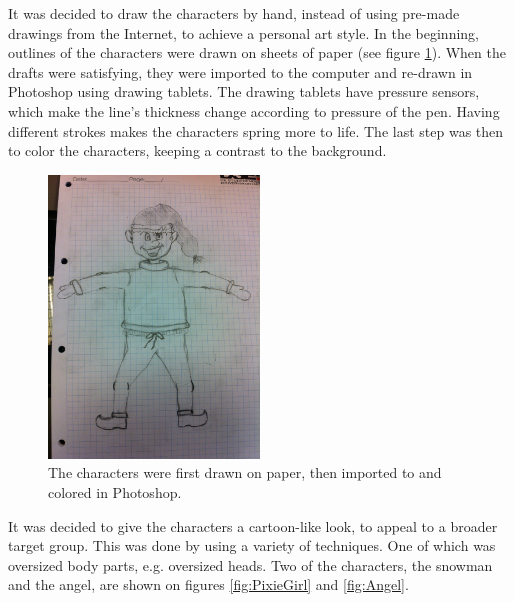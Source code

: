 It was decided to draw the characters by hand, instead of using pre-made drawings from the Internet, to achieve a personal art style. In the beginning, outlines of the characters were drawn on sheets of paper (see figure \ref{fig:boy_sketch}). When the drafts were satisfying, they were imported to the computer and re-drawn in Photoshop using drawing tablets. The drawing tablets have pressure sensors, which make the line's thickness change according to pressure of the pen. Having different strokes makes the characters spring more to life. The last step was then to color the characters, keeping a contrast to the background.

\begin{figure}[htbp]
\centering
\includegraphics[width=0.50\textwidth]{Pictures/Design/boy_sketch}
\caption{The characters were first drawn on paper, then imported to and colored in Photoshop.}
\label{fig:boy_sketch}
\end{figure}

It was decided to give the characters a cartoon-like look, to appeal to a broader target group. This was done by using a variety of techniques. One of which was oversized body parts, e.g. oversized heads. Two of the characters, the snowman and the angel, are shown on figures \ref{fig:PixieGirl} and \ref{fig:Angel}.

